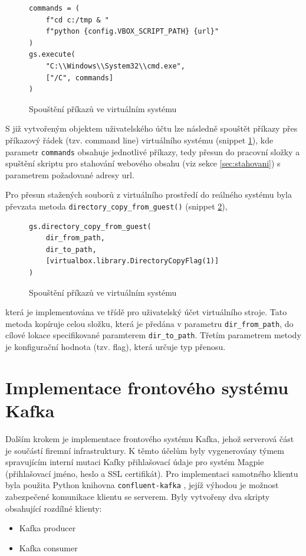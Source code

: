 \documentclass[thesis=M,czech,hidelinks]{FITthesis}[2013/05/06]
\begin{document}
\begin{figure}[h]               
	\begin{verbatim}
commands = (
    f"cd c:/tmp & "
    f"python {config.VBOX_SCRIPT_PATH} {url}"
)
gs.execute(
    "C:\\Windows\\System32\\cmd.exe", 
    ["/C", commands]
)
	\end{verbatim}      
	\caption{Spouštění příkazů ve virtuálním systému}
	\label{snip:vboxcommand}
\end{figure}
S již vytvořeným objektem uživatelského účtu lze následně spouštět příkazy přes příkazový řádek (tzv. command line) virtuálního systému (snippet \ref{snip:vboxcommand}), kde parametr \texttt{commands} obsahuje jednotlivé příkazy, tedy přesun do pracovní složky a spuštění skriptu pro stahování webového obsahu (viz sekce \ref{sec:stahovani}) s parametrem požadované adresy url.

Pro přesun stažených souborů z virtuálního prostředí do reálného systému byla převzata metoda \texttt{directory_copy_from_guest()} (snippet \ref{snip:vboxcopy}),
\begin{figure}[h]               
	\begin{verbatim}
gs.directory_copy_from_guest(
    dir_from_path,
    dir_to_path,
    [virtualbox.library.DirectoryCopyFlag(1)]
)
	\end{verbatim}      
	\caption{Spouštění příkazů ve virtuálním systému}
	\label{snip:vboxcopy}
\end{figure}
 která je implementována ve třídě pro uživatelský účet virtuálního stroje. Tato metoda kopíruje celou složku, která je předána v parametru \texttt{dir_from_path}, do cílové lokace specifikované paramterem \texttt{dir_to_path}. Třetím parametrem metody je konfigurační hodnota (tzv. flag), která určuje typ přenosu.








\section{Implementace frontového systému Kafka}

Dalším krokem je implementace frontového systému Kafka, jehož serverová část je součástí firemní infrastruktury. K těmto účelům byly vygenerovány týmem spravujícím interní mutaci Kafky přihlašovací údaje pro systém Magpie (přihlašovací jméno, heslo a SSL certifikát). Pro implementaci samotného klientu byla použita Python knihovna \texttt{confluent-kafka} \cite{confluent-kafka}, jejíž výhodou je možnost zabezpečené komunikace klientu se serverem. Byly vytvořeny dva skripty obsahující rozdílné klienty:
\begin{itemize}
	\item Kafka producer
	\item Kafka consumer
\end{itemize}
\end{document}
